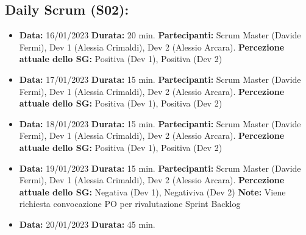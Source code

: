 \documentclass[a4paper, oneside]{article}
\newcommand\due{Scrum Master (Davide Fermi), Dev 1 (Alessia Crimaldi), Dev 2 (Alessio Arcara).}
\begin{document}
\begin{landscape}
        \subsection{Daily Scrum (S02):}
        \begin{itemize}
            \item \textbf{Data:} 16/01/2023
            \newline \textbf{Durata:} 20 min.
            \newline \textbf{Partecipanti:} \due
            \newline \textbf{Percezione attuale dello SG:} Positiva (Dev 1), Positiva (Dev 2)
        \end{itemize}
        \begin{itemize}
            \item \textbf{Data:} 17/01/2023
            \newline \textbf{Durata:} 15 min.
            \newline \textbf{Partecipanti:} \due
            \newline \textbf{Percezione attuale dello SG:} Positiva (Dev 1), Positiva (Dev 2)
        \end{itemize}
        \begin{itemize}
            \item \textbf{Data:} 18/01/2023
            \newline \textbf{Durata:} 15 min.
            \newline \textbf{Partecipanti:} \due
            \newline \textbf{Percezione attuale dello SG:} Positiva (Dev 1), Positiva (Dev 2)
        \end{itemize}
        \begin{itemize}
            \item \textbf{Data:} 19/01/2023
            \newline \textbf{Durata:} 15 min.
            \newline \textbf{Partecipanti:} \due
            \newline \textbf{Percezione attuale dello SG:} Negativa (Dev 1), Negativiva (Dev 2)
            \newline \textbf{Note:} Viene richiesta convocazione PO per rivalutazione Sprint Backlog
        \end{itemize}
        \begin{itemize}
            \item \textbf{Data:} 20/01/2023
            \newline \textbf{Durata:} 45 min.

\end{itemize}
\end{landscape}
\end{document}

